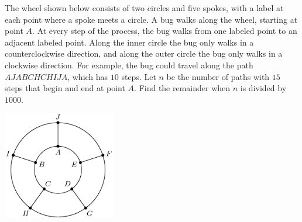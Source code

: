 The wheel shown below consists of two circles and five spokes, with a label at each point where a spoke meets a circle. A bug walks along the wheel, starting at point \(A\). At every step of the process, the bug walks from one labeled point to an adjacent labeled point. Along the inner circle the bug only walks in a counterclockwise direction, and along the outer circle the bug only walks in a clockwise direction. For example, the bug could travel along the path \(AJABCHCHIJA\), which has \(10\) steps. Let \(n\) be the number of paths with \(15\) steps that begin and end at point \(A\). Find the remainder when \(n\) is divided by \(1000\).

\begin{center}
\includegraphics[width = 49.0mm]{img/fig0.png}
\end{center}